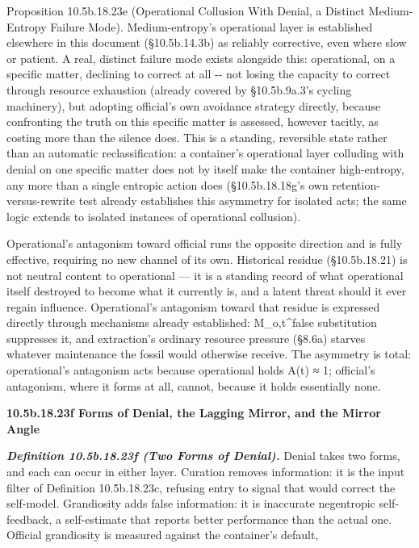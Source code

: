 \documentclass[
]{article}
\begin{document}
Proposition 10.5b.18.23e (Operational Collusion With Denial, a Distinct
Medium-Entropy Failure Mode). Medium-entropy's operational layer is
established elsewhere in this document (§10.5b.14.3b) as reliably
corrective, even where slow or patient. A real, distinct failure mode
exists alongside this: operational, on a specific matter, declining to
correct at all -\/- not losing the capacity to correct through resource
exhaustion (already covered by §10.5b.9a.3's cycling machinery), but
adopting official's own avoidance strategy directly, because confronting
the truth on this specific matter is assessed, however tacitly, as
costing more than the silence does. This is a standing, reversible state
rather than an automatic reclassification: a container's operational
layer colluding with denial on one specific matter does not by itself
make the container high-entropy, any more than a single entropic action
does (§10.5b.18.18g's own retention-versus-rewrite test already
establishes this asymmetry for isolated acts; the same logic extends to
isolated instances of operational collusion).

Operational's antagonism toward official runs the opposite direction and
is fully effective, requiring no new channel of its own. Historical
residue (§10.5b.18.21) is not neutral content to operational --- it is a
standing record of what operational itself destroyed to become what it
currently is, and a latent threat should it ever regain influence.
Operational's antagonism toward that residue is expressed directly
through mechanisms already established: M\_o,t\^{}false substitution
suppresses it, and extraction's ordinary resource pressure (§8.6a)
starves whatever maintenance the fossil would otherwise receive. The
asymmetry is total: operational's antagonism acts because operational
holds A(t) ≈ 1; official's antagonism, where it forms at all, cannot,
because it holds essentially none.

\textbf{10.5b.18.23f Forms of Denial, the Lagging Mirror, and the Mirror
Angle}

\emph{\textbf{Definition 10.5b.18.23f (Two Forms of Denial).}} Denial
takes two forms, and each can occur in either layer. Curation removes
information: it is the input filter of Definition 10.5b.18.23c, refusing
entry to signal that would correct the self-model. Grandiosity adds
false information: it is inaccurate negentropic self-feedback, a
self-estimate that reports better performance than the actual one.
Official grandiosity is measured against the container's default,
\end{document}
